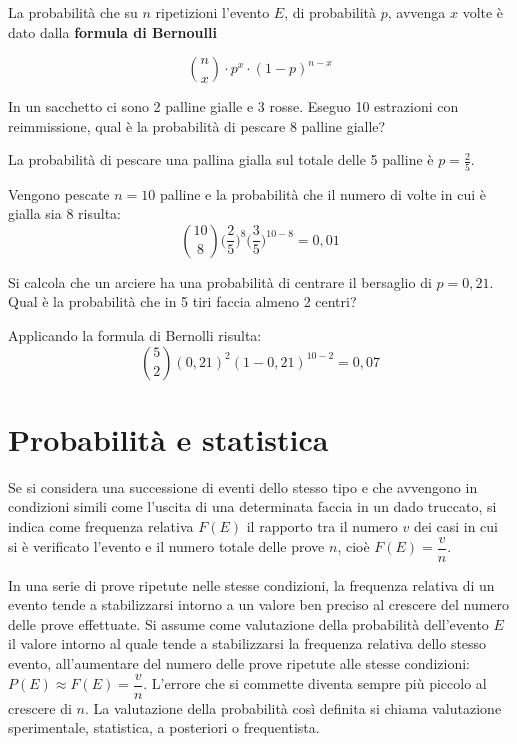 \begin{definizione}
La probabilità che su $n$ ripetizioni l'evento $E$, di probabilità $p$, 
avvenga $x$ volte è dato dalla \textbf{formula di Bernoulli}

$$ \binom{n}{x}\cdot p^{x}\cdot(1-p)^{n-x}$$
\end{definizione}

\begin{esempio}
In un sacchetto ci sono 2 palline gialle e 3 rosse. Eseguo 10 estrazioni con 
reimmissione, qual è la probabilità di pescare 8 palline gialle?

La probabilità di pescare una pallina gialla sul totale delle 5 palline è 
$p=\frac{2}{5}$.

Vengono pescate $n=10$ palline e la probabilità che il numero di volte in cui 
è gialla sia 8 risulta:
$$ \binom{10}{8} \big(\frac{2}{5}\big)^{8}\big(\frac{3}{5}\big)^{10-8}=0,01$$

\end{esempio}

\begin{esempio}
Si calcola che un arciere ha una probabilità di centrare il bersaglio di 
$p=0,21$. Qual è la probabilità che in 5 tiri faccia almeno 2 centri?


Applicando la formula di Bernolli risulta:
$$ \binom{5}{2} (0,21)^{2}(1-0,21)^{10-2}=0,07$$

\end{esempio}

\section{Probabilità e statistica}
\label{sec:06_statistica}
Se si considera una successione di eventi dello stesso tipo e che avvengono 
in 
condizioni simili come l'uscita di una determinata faccia in un dado 
truccato, 
si indica come frequenza relativa $F(E)$ il rapporto tra il numero $v$ dei 
casi 
in cui si è verificato l'evento e il numero totale delle prove $n$, cioè 
$F(E)=\dfrac v n$.

In una serie di prove ripetute nelle stesse condizioni, la frequenza relativa 
di 
un evento tende a stabilizzarsi intorno a un valore ben preciso al crescere 
del 
numero delle prove effettuate.
Si assume come valutazione della probabilità dell'evento $E$ il valore 
intorno 
al quale tende a stabilizzarsi la frequenza relativa dello stesso evento, 
all'aumentare del numero delle prove ripetute alle stesse condizioni: 
$P(E)\approx F(E)=\dfrac v n$.
L'errore che si commette diventa sempre più piccolo al crescere di $n$. La 
valutazione della probabilità così definita si chiama valutazione 
sperimentale, 
statistica, a posteriori o frequentista.

